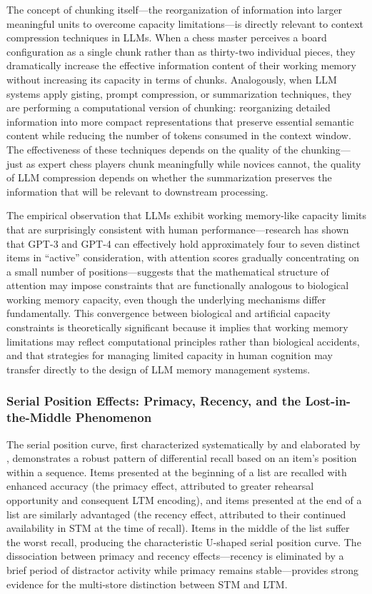 \documentclass[11pt,letterpaper]{article}
\begin{document}
The concept of chunking itself---the reorganization of information into larger meaningful units to overcome capacity limitations---is directly relevant to context compression techniques in LLMs. When a chess master perceives a board configuration as a single chunk rather than as thirty-two individual pieces, they dramatically increase the effective information content of their working memory without increasing its capacity in terms of chunks. Analogously, when LLM systems apply gisting, prompt compression, or summarization techniques, they are performing a computational version of chunking: reorganizing detailed information into more compact representations that preserve essential semantic content while reducing the number of tokens consumed in the context window. The effectiveness of these techniques depends on the quality of the chunking---just as expert chess players chunk meaningfully while novices cannot, the quality of LLM compression depends on whether the summarization preserves the information that will be relevant to downstream processing.

The empirical observation that LLMs exhibit working memory-like capacity limits that are surprisingly consistent with human performance---research has shown that GPT-3 and GPT-4 can effectively hold approximately four to seven distinct items in ``active'' consideration, with attention scores gradually concentrating on a small number of positions---suggests that the mathematical structure of attention may impose constraints that are functionally analogous to biological working memory capacity, even though the underlying mechanisms differ fundamentally. This convergence between biological and artificial capacity constraints is theoretically significant because it implies that working memory limitations may reflect computational principles rather than biological accidents, and that strategies for managing limited capacity in human cognition may transfer directly to the design of LLM memory management systems.

\subsubsection{Serial Position Effects: Primacy, Recency, and the Lost-in-the-Middle Phenomenon}

The serial position curve, first characterized systematically by \cite{murdock1962serial} and elaborated by \cite{glanzer1966two}, demonstrates a robust pattern of differential recall based on an item's position within a sequence. Items presented at the beginning of a list are recalled with enhanced accuracy (the primacy effect, attributed to greater rehearsal opportunity and consequent LTM encoding), and items presented at the end of a list are similarly advantaged (the recency effect, attributed to their continued availability in STM at the time of recall). Items in the middle of the list suffer the worst recall, producing the characteristic U-shaped serial position curve. The dissociation between primacy and recency effects---recency is eliminated by a brief period of distractor activity while primacy remains stable---provides strong evidence for the multi-store distinction between STM and LTM.
\end{document}
